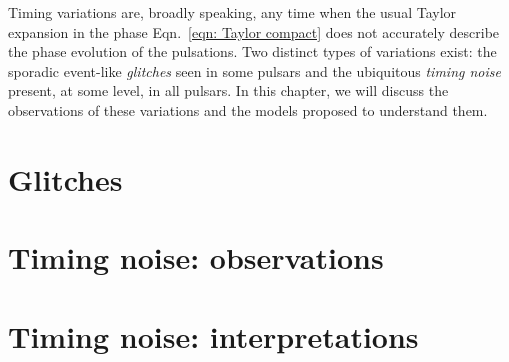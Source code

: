 \documentclass[../full_thesis/full_thesis.tex]{subfiles}
\newcommand{\thisdir}{../timing_variations}
\begin{document}
Timing variations are, broadly speaking, any time when the usual Taylor
expansion in the phase Eqn.~\eqref{eqn: Taylor compact} does not accurately
describe the phase evolution of the pulsations. Two distinct types of variations
exist: the sporadic event-like \emph{glitches} seen in some pulsars
and the ubiquitous \emph{timing noise} present, at some level, in all pulsars.
In this chapter, we will discuss the observations of these variations and the
models proposed to understand them.

\section{Glitches}
\label{sec: glitches}


\section{Timing noise: observations}
\label{sec: timing noise observations}


\section{Timing noise: interpretations}
\label{sec: timing noise interpretations}


\biblio
\end{document}
